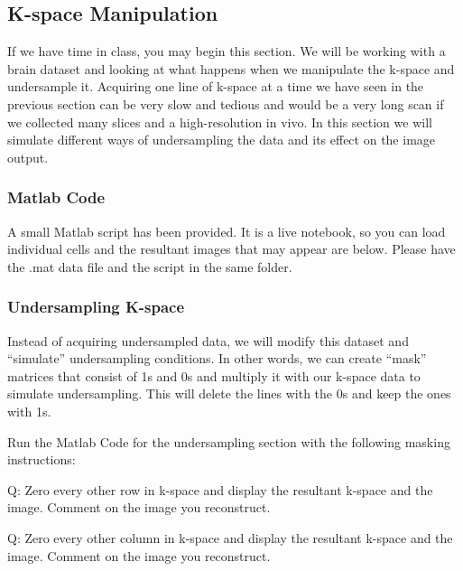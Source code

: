 \newpage
\subsection{K-space Manipulation}
If we have time in class, you may begin this section. We will be working with a brain dataset and looking at what happens when we manipulate the k-space and undersample it. Acquiring one line of k-space at a time we have seen in the previous section can be very slow and tedious and would be a very long scan if we collected many slices and a high-resolution in vivo. In this section we will simulate different ways of undersampling the data and its effect on the image output.

\subsubsection{Matlab Code}
A small Matlab script has been provided. It is a live notebook, so you can load individual cells and the resultant images that may appear are below. Please have the .mat data file and the script in the same folder.  


\subsubsection{Undersampling K-space}
Instead of acquiring undersampled data, we will modify this dataset and “simulate” undersampling conditions. In other words, we can create “mask” matrices that consist of 1s and 0s and multiply it with our k-space data to simulate undersampling. This will delete the lines with the 0s and keep the ones with 1s. 

\vspace{5mm} 

\noindent{} Run the Matlab Code for the undersampling section with the following masking instructions:

\vspace{5mm} 
 
\noindent{}\color{red}Q: Zero every other row in k-space and display the resultant k-space and the image. Comment on the image you reconstruct.

\color{black}
\vspace{5mm} 

\noindent{}\color{red}Q: Zero every other column in k-space and display the resultant k-space and the image. Comment on the image you reconstruct.
\color{black}

\vspace{5mm} 

